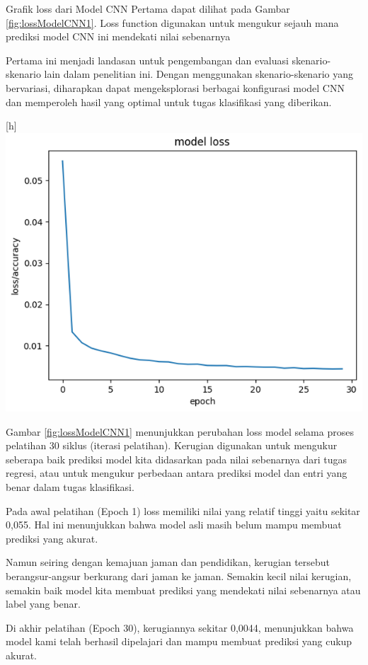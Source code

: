 Grafik loss dari Model CNN Pertama dapat dilihat pada Gambar \ref{fig:lossModelCNN1}. Loss function digunakan untuk mengukur sejauh mana prediksi model CNN ini mendekati nilai sebenarnya

Pertama ini menjadi landasan untuk pengembangan dan evaluasi skenario-skenario lain dalam penelitian ini. Dengan menggunakan skenario-skenario yang bervariasi, diharapkan dapat mengeksplorasi berbagai konfigurasi model CNN dan memperoleh hasil yang optimal untuk tugas klasifikasi yang diberikan.

\begin{center}[h]
	\includegraphics[width=0.7\linewidth]{gambar/bener/Loss_ModelCNN.png}
	\label{fig:lossModelCNN1}
\end{center}
Gambar \ref{fig:lossModelCNN1}  menunjukkan perubahan loss model selama proses pelatihan 30 siklus (iterasi pelatihan). Kerugian digunakan untuk mengukur seberapa baik prediksi model kita didasarkan pada nilai sebenarnya dari tugas regresi, atau untuk mengukur perbedaan antara prediksi model dan entri yang benar dalam tugas klasifikasi.

Pada awal pelatihan (Epoch 1) loss memiliki nilai yang relatif tinggi yaitu sekitar 0,055. Hal ini menunjukkan bahwa model asli masih belum mampu membuat prediksi yang akurat.

Namun seiring dengan kemajuan jaman dan pendidikan, kerugian tersebut berangsur-angsur berkurang dari jaman ke jaman. Semakin kecil nilai kerugian, semakin baik model kita membuat prediksi yang mendekati nilai sebenarnya atau label yang benar.

Di akhir pelatihan (Epoch 30), kerugiannya sekitar 0,0044, menunjukkan bahwa model kami telah berhasil dipelajari dan mampu membuat prediksi yang cukup akurat. 

